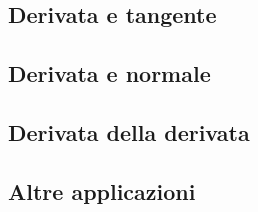 \subsection{Derivata e tangente}
\label{subsec:differenziazione_derivataetangente}

\subsection{Derivata e normale}
\label{subsec:differenziazione_derivataenormale}

\subsection{Derivata della derivata}
\label{subsec:differenziazione_derivataseconda}

\subsection{Altre applicazioni}
\label{subsec:differenziazione_altreapplicazioni}

